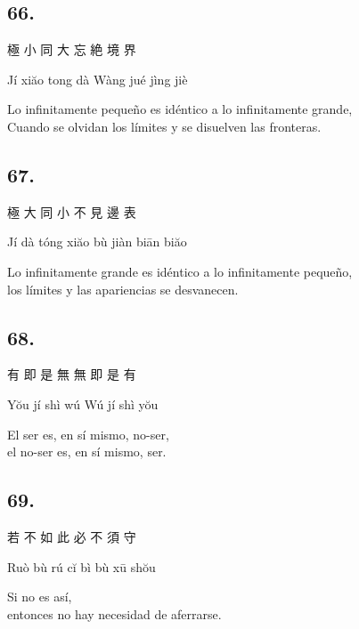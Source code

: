 \documentclass[
  a5paperpaper,
]{article}
\begin{document}
\begin{verseblock}

\hypertarget{section-140}{%
\subsection{66.}\label{section-140}}

極 小 同 大 忘 絶 境 界

Jí xiăo tong dà Wàng jué jìng jiè

Lo infinitamente pequeño es idéntico a lo infinitamente grande,\\
Cuando se olvidan los límites y se disuelven las fronteras.

\end{verseblock}

\begin{verseblock}

\hypertarget{section-141}{%
\subsection{67.}\label{section-141}}

極 大 同 小 不 見 邊 表

Jí dà tóng xiăo bù jiàn biān biăo

Lo infinitamente grande es idéntico a lo infinitamente pequeño,\\
los límites y las apariencias se desvanecen.

\end{verseblock}

\begin{verseblock}

\hypertarget{section-142}{%
\subsection{68.}\label{section-142}}

有 即 是 無 無 即 是 有

Yŏu jí shì wú Wú jí shì yŏu

El ser es, en sí mismo, no-ser,\\
el no-ser es, en sí mismo, ser.

\end{verseblock}

\begin{verseblock}

\hypertarget{section-143}{%
\subsection{69.}\label{section-143}}

若 不 如 此 必 不 須 守

Ruò bù rú cĭ bì bù xū shŏu

Si no es así,\\
entonces no hay necesidad de aferrarse.

\end{verseblock}
\end{document}
